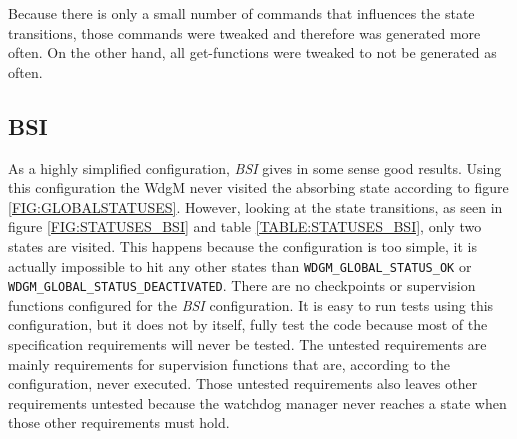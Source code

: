 Because there is only a small number of commands that influences the
state transitions, those commands were tweaked and therefore was
generated more often. On the other hand, all get-functions were
tweaked to not be generated as often.

\subsection{BSI}
As a highly simplified configuration, \emph{BSI} gives in some sense
good results.  Using this configuration the WdgM never visited the
absorbing state according to figure \ref{FIG:GLOBALSTATUSES}. However,
looking at the state transitions, as seen in figure
\ref{FIG:STATUSES_BSI} and table \ref{TABLE:STATUSES_BSI}, only two
states are visited. This happens because the configuration is too
simple, it is actually impossible to hit any other states than
\lstinline!WDGM_GLOBAL_STATUS_OK! or
\lstinline!WDGM_GLOBAL_STATUS_DEACTIVATED!. There are no checkpoints
or supervision functions configured for the \emph{BSI} configuration.
It is easy to run tests using this configuration, but it does not by itself,
fully test the code because most of the specification 
requirements will never be tested. The untested requirements are
mainly requirements for supervision functions that are, according to
the configuration, never executed. Those untested requirements also
leaves other requirements untested because the watchdog manager never
reaches a state when those other requirements must hold.

